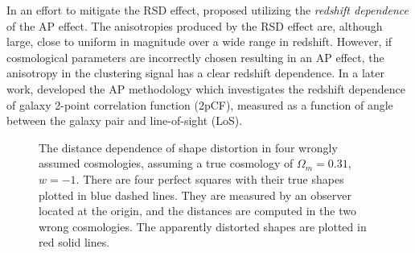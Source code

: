 \documentclass[prl,twocolumn,superscriptaddress,aps,amsmath,amssymb,nofootinbib,altaffilletter]{revtex4}
\begin{document}
In an effort to mitigate the RSD effect, \cite{Li2014} proposed utilizing the {\it redshift dependence} of the AP effect. 
The anisotropies produced by the RSD effect are, although large, close to uniform in magnitude over a wide range in redshift. 
However, if cosmological parameters are incorrectly chosen resulting in an AP effect, 
the anisotropy in the clustering signal has a clear redshift dependence. 
In a later work, \cite{Li2015} developed the AP methodology 
which investigates the redshift dependence of galaxy 2-point correlation function (2pCF), 
measured as a function of angle between the galaxy pair and line-of-sight (LoS).

\begin{figure}
   \caption{\label{fig_xy}
   The distance dependence of shape distortion in four wrongly assumed cosmologies,
   assuming a true cosmology of $\Omega_m=0.31$, $w=-1$.
   There are four perfect squares with their true shapes plotted in blue dashed lines.
   They are measured by an observer located at the origin, and the distances are computed in the two wrong cosmologies.
   The apparently distorted shapes are plotted in red solid lines.
   }
\end{figure}



\end{document}
